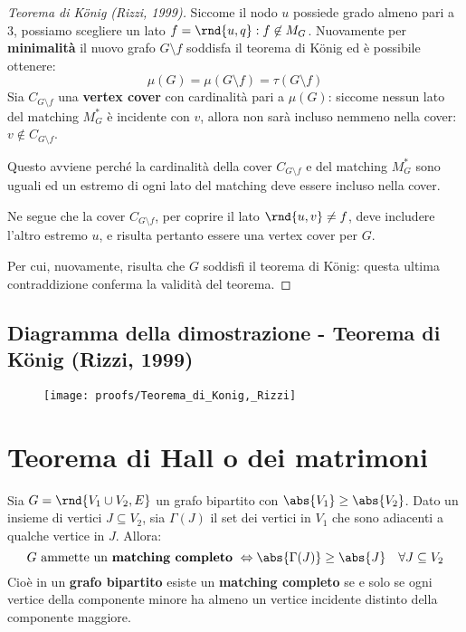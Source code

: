 \documentclass[\main/main.tex]{subfiles}
\begin{document}
\begin{proof}[Teorema di König (Rizzi, 1999)]
	Siccome il nodo \(u\) possiede grado almeno pari a \(3\), possiamo scegliere un lato \(f=\rnd{u,q}: f \not\in M_G\). Nuovamente per \textbf{minimalità} il nuovo grafo \(G\setminus f\) soddisfa il teorema di König ed è possibile ottenere:
	\[\mu(G) = \mu(G\setminus f) = \tau(G\setminus f)\]
	Sia \(C_{G\setminus f}\) una \textbf{vertex cover} con cardinalità pari a \(\mu(G)\): siccome nessun lato del matching \(M^*_G\) è incidente con \(v\), allora non sarà incluso nemmeno nella cover: \(v \not\in C_{G\setminus f}\).

	Questo avviene perché la cardinalità della cover \(C_{G\setminus f}\) e del matching \(M^*_G\) sono uguali ed un estremo di ogni lato del matching deve essere incluso nella cover.

	Ne segue che la cover \(C_{G\setminus f}\), per coprire il lato \(\rnd{u,v} \neq f\), deve includere l'altro estremo \(u\), e risulta pertanto essere una vertex cover per \(G\).

	Per cui, nuovamente, risulta che \(G\) soddisfi il teorema di König: questa ultima contraddizione conferma la validità del teorema.
\end{proof}
\clearpage
\subsection{Diagramma della dimostrazione - Teorema di König (Rizzi, 1999)}
\begin{figure}
	\texttt{[image: proofs/Teorema\_di\_Konig,\_Rizzi]}
\end{figure}
\clearpage
\section{Teorema di Hall o dei matrimoni}
\begin{theorem}
	Sia \(G = \rnd{V_1 \cup V_2, E}\) un grafo bipartito con \(\abs{V_1} \geq \abs{V_2}\). Dato un insieme di vertici \(J \subseteq V_2\), sia \(\Gamma(J) \) il set dei vertici in \(V_1\) che sono adiacenti a qualche vertice in \(J\). Allora:
	\[
		G \text{ ammette un \textbf{matching completo} } \Leftrightarrow \abs{\Gamma(J)} \geq \abs{J} \quad \forall J \subseteq V_2
	\]
	Cioè in un \textbf{grafo bipartito} esiste un \textbf{matching completo} se e solo se ogni vertice della componente minore ha almeno un vertice incidente distinto della componente maggiore.
\end{theorem}
\end{document}
